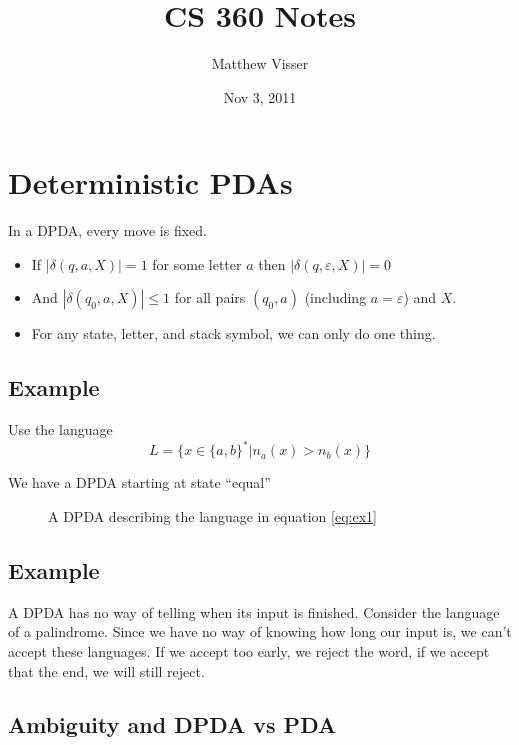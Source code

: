 \documentclass[12pt]{article}
\numberwithin{equation}{subsection}
\begin{document}
\title{CS 360 Notes}
\author{Matthew Visser}
\date{Nov  3, 2011}
\maketitle

\section{Deterministic PDAs}

In a DPDA, every move is fixed.

\begin{itemize}
	\item If $ |\delta(q,a,X)| = 1$ for some letter $a$ then
		$|\delta(q,\varepsilon,X)|= 0$
	\item And $|\delta(q_0,a,X)|\le 1$ for all pairs $(q_0,a)$ (including $a =
		\varepsilon$) and $X$.
	\item For any state, letter, and stack symbol, we can only do one thing.
\end{itemize}

\subsection{Example}

Use the language
\begin{equation}
	L = \{ x \in \{a,b\}^* | n_a(x) > n_b(x) \}
	\label{eq:ex1}
\end{equation}

We have a DPDA starting at state ``equal''
\begin{figure}[H]
	
	\caption{A DPDA describing the language in equation \ref{eq:ex1}}
	\label{fig:ex1}
\end{figure}

\subsection{Example}

A DPDA has no way of telling when its input is finished. Consider the language
of a palindrome.  Since we have no way of knowing how long our input is, we
can't accept these languages. If we accept too early, we reject the word, if we
accept that the end, we will still reject.

\subsection{Ambiguity and DPDA vs PDA}
\end{document}

